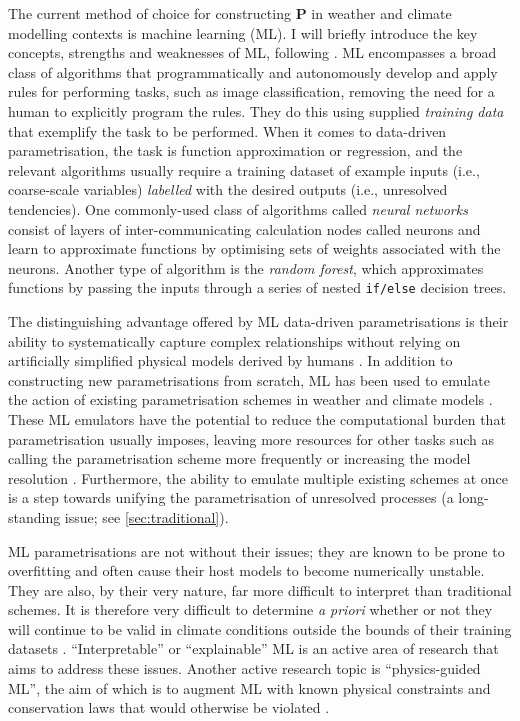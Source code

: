 \documentclass[titlepage,twoside]{article}
\numberwithin{equation}{section}
\renewcommand\vec{\bm}
\begin{document}
The current method of choice for constructing $\vec{P}$ in weather and climate
modelling contexts is machine learning (ML). I will briefly introduce the key
concepts, strengths and weaknesses of ML, following \textcite{beucler2022}. ML
encompasses a broad class of algorithms that programmatically and autonomously
develop and apply rules for performing tasks, such as image classification,
removing the need for a human to explicitly program the rules. They do this
using supplied \emph{training data} that exemplify the task to be performed.
When it comes to data-driven parametrisation, the task is function
approximation or regression, and the relevant algorithms usually require a
training dataset of example inputs (i.e., coarse-scale variables)
\emph{labelled} with the desired outputs (i.e., unresolved tendencies). One
commonly-used class of algorithms called \emph{neural networks} consist of
layers of inter-communicating calculation nodes called neurons and learn to
approximate functions by optimising sets of weights associated with the
neurons. Another type of algorithm is the \emph{random forest}, which
approximates functions by passing the inputs through a series of nested
\texttt{if/else} decision trees.

The distinguishing advantage offered by ML data-driven parametrisations is
their ability to systematically capture complex relationships without relying
on artificially simplified physical models derived by humans
\parencite{irrgang2021,beucler2022}. In addition to constructing new
parametrisations from scratch, ML has been used to emulate the action of
existing parametrisation schemes in weather and climate models
\parencite[e.g.,][]{gentine2018}. These ML emulators have the potential to
reduce the computational burden that parametrisation usually imposes, leaving
more resources for other tasks such as calling the parametrisation scheme more
frequently or increasing the model resolution \parencite{beucler2022}.
Furthermore, the ability to emulate multiple existing schemes at once is a step
towards unifying the parametrisation of unresolved processes (a long-standing
issue; see \cref{sec:traditional}).

ML parametrisations are not without their issues; they are known to be prone to
overfitting and often cause their host models to become numerically unstable.
They are also, by their very nature, far more difficult to interpret than
traditional schemes. It is therefore very difficult to determine \emph{a
priori} whether or not they will continue to be valid in climate conditions
outside the bounds of their training datasets
\parencite{irrgang2021,beucler2022}. ``Interpretable'' or ``explainable'' ML is
an active area of research that aims to address these issues. Another active
research topic is ``physics-guided ML'', the aim of which is to augment ML with
known physical constraints and conservation laws that would otherwise be
violated \parencite[e.g.,][]{yuval2021}.
\end{document}
